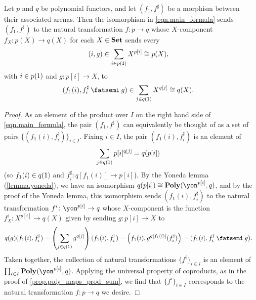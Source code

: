\documentclass[Book-Poly]{subfiles}
\begin{document}
\begin{proposition} \label{prop.morph_arena_to_func}
Let $p$ and $q$ be polynomial functors, and let $(f_1, f^\sharp)$ be a morphism between their associated arenas.
Then the isomorphism in \eqref{eqn.main_formula} sends $(f_1, f^\sharp)$ to the natural transformation $f \colon p \to q$ whose $X$-component $f_X \colon p(X) \to q(X)$ for each $X \in \mathbf{Set}$ sends every
\[
    (i, g) \in \sum_{i \in p(\textsf{1})} X^{p[i]} \cong p(X),
\]
with $i \in p(\textsf{1})$ and $g \colon p[i] \to X$, to
\[
    (f_1(i), f^\sharp_i \then g) \in \sum_{j \in q(\1)} X^{q[j]} \iso q(X).
\]
\end{proposition}
\begin{proof}
As an element of the product over $I$ on the right hand side of \eqref{eqn.main_formula}, the pair $(f_1, f^\sharp)$ can equivalently be thought of as a set of pairs $\{(f_1(i), f^\sharp_i)\}_{i \in I}$.
Fixing $i \in I$, the pair $(f_1(i), f^\sharp_i)$ is an element of
\[
    \sum_{j \in q(\textsf{1})} p[i]^{q[j]} = q(p[i])
\]
(so $f_1(i) \in q(\textsf{1})$ and $f^\sharp_i \colon q[f_1(i)] \to p[i]$).
By the Yoneda lemma (\cref{lemma.yoneda}), we have an isomorphism $q(p[i]) \iso \poly(\yon^{p[i]}, q)$, and by the proof of the Yoneda lemma, this isomorphism sends $(f_1(i), f^\sharp_i)$ to the natural transformation $f^i \colon \yon^{p[i]} \to q$ whose $X$-component is the function $f^i_X \colon X^{p[i]} \to q(X)$ given by sending $g \colon p[i] \to X$ to
\[
    q(g)(f_1(i), f^\sharp_i) = \left(\sum_{j \in q(\1)} g^{q[j]}\right)(f_1(i), f^\sharp_i) = \left(f_1(i), g^{q[f_1(i)]}(f^\sharp_i)\right) = (f_1(i), f^\sharp_i \then g).
\]
Taken together, the collection of natural transformations $\{f^i\}_{i \in I}$ is an element of $\prod_{i \in I} \poly(\yon^{p[i]}, q)$.
Applying the universal property of coproducts, as in the proof of \cref{prop.poly_maps_prod_sum}, we find that $\{f^i\}_{i \in I}$ corresponds to the natural transformation $f \colon p \to q$ we desire.
\end{proof}
\end{document}

